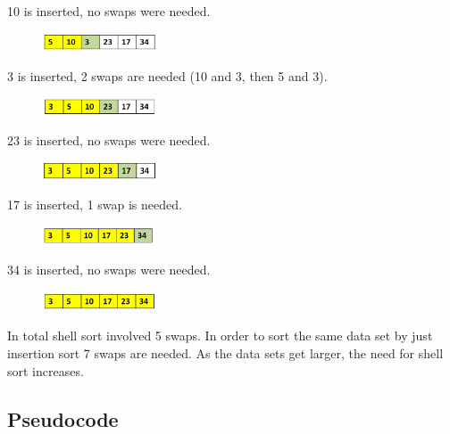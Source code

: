 10 is inserted, no swaps were needed.

\begin{figure}[H]
\centering
\includegraphics[width=0.3\textwidth]{pictures/shell5.png}
\label{fig:shell5}
\end{figure}

3 is inserted, 2 swaps are needed (10 and 3, then 5 and 3).

\begin{figure}[H]
\centering
\includegraphics[width=0.3\textwidth]{pictures/shell6.png}
\label{fig:shell6}
\end{figure}

23 is inserted, no swaps were needed.

\begin{figure}[H]
\centering
\includegraphics[width=0.3\textwidth]{pictures/shell7.png}
\label{fig:shell7}
\end{figure}

17 is inserted, 1 swap is needed.

\begin{figure}[H]
\centering
\includegraphics[width=0.3\textwidth]{pictures/shell8.png}
\label{fig:shell8}
\end{figure}

34 is inserted, no swaps were needed.

\begin{figure}[H]
\centering
\includegraphics[width=0.3\textwidth]{pictures/shell9.png}
\label{fig:shell9}
\end{figure}

In total shell sort involved 5 swaps. In order to sort the same data set by just insertion sort 7 swaps are needed. As the data sets get larger, the need for shell sort increases.

\subsection{Pseudocode}

